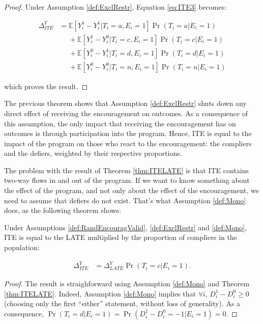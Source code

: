 \documentclass[]{book}
\newcommand{\esp}[1]{\mathbb{E}[ #1 ]}
\theoremstyle{definition}
\theoremstyle{definition}
\theoremstyle{definition}
\theoremstyle{remark}
\let\BeginKnitrBlock\begin \let\EndKnitrBlock\end
\begin{document}
\BeginKnitrBlock{proof}
\iffalse{} {Proof. } \fi{}Under Assumption \ref{def:ExclRestr}, Equation
\eqref{eq:ITE3} becomes:

\begin{align*}
  \Delta^Y_{ITE} & = \esp{Y_i^{1}-Y_i^{1}|T_i=a,E_i=1}\Pr(T_i=a|E_i=1)\\
                & \phantom{=}+ \esp{Y_i^{1}-Y_i^{0}|T_i=c,E_i=1}\Pr(T_i=c|E_i=1)\\
                & \phantom{=}+ \esp{Y_i^{0}-Y_i^{1}|T_i=d,E_i=1}\Pr(T_i=d|E_i=1)\\
                & \phantom{=}+ \esp{Y_i^{0}-Y_i^{0}|T_i=n,E_i=1}\Pr(T_i=n|E_i=1)
\end{align*}

which proves the result.
\EndKnitrBlock{proof}

The previous theorem shows that Assumption \ref{def:ExclRestr} shuts
down any direct effect of receiving the encouragement on outcomes. As a
consequence of this assumption, the only impact that receiving the
encouragement has on outcomes is through participation into the program.
Hence, ITE is equal to the impact of the program on those who react to
the encouragement: the compliers and the defiers, weighted by their
respective proportions.

The problem with the result of Theorem \ref{thm:ITELATE} is that ITE
contains two-way flows in and out of the program. If we want to know
something about the effect of the program, and not only about the effect
of the encouragement, we need to assume that defiers do not exist.
That's what Assumption \ref{def:Mono} does, as the following theorem
shows:

\BeginKnitrBlock{theorem}[From ITE to LATE]
\protect\hypertarget{thm:ITELATEMono}{}{\label{thm:ITELATEMono}
\iffalse (From ITE to LATE) \fi{} }Under Assumptions
\ref{def:RandEncouragValid}, \ref{def:ExclRestr} and \ref{def:Mono}, ITE
is equal to the LATE multiplied by the proportion of compliers in the
population:

\begin{align*}
  \Delta^Y_{ITE} & = \Delta^Y_{LATE}\Pr(T_i=c|E_i=1).
\end{align*}
\EndKnitrBlock{theorem}

\BeginKnitrBlock{proof}
\iffalse{} {Proof. } \fi{}The result is straighforward using Assumption
\ref{def:Mono} and Theorem \ref{thm:ITELATE}. Indeed, Assumption
\ref{def:Mono} implies that \(\forall i\), \(D_i^1-D_i^0\geq 0\)
(choosing only the first ``either'' statement, without loss of
generality). As a consequence,
\(\Pr(T_i=d|E_i=1)=\Pr(D_i^1-D_i^0=-1|E_i=1)=0\).
\EndKnitrBlock{proof}
\end{document}
